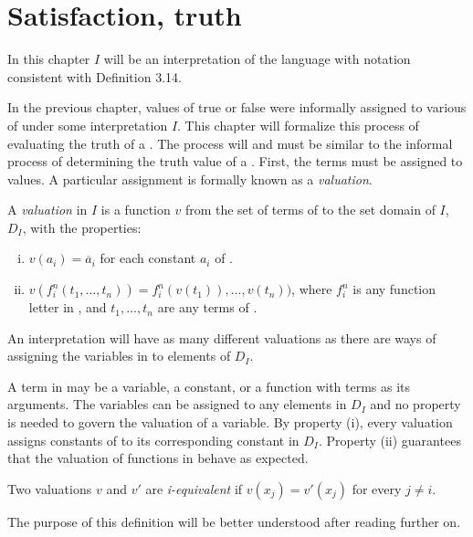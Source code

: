 \section{Satisfaction, truth}

In this chapter \(I\) will be an interpretation of the language \cl{} with notation consistent with Definition 3.14.

In the previous chapter, values of true or false were informally assigned to various \wfs{} of \cl{} under some interpretation \(I\). This chapter will formalize this process of evaluating the truth of a \wf{}. The process will and must be similar to the informal process of determining the truth value of a \wf{}. First, the terms must be assigned to values. A particular assignment is formally known as a \textit{valuation}.

\setcounter{definition}{16}
\begin{definition}
  A \textit{valuation} in \(I\) is a function \(v\) from the set of terms of \cl{} to the set domain of \(I\), \(D_I\), with the properties:
  \begin{enumerate}[(i)]
    \item \(v(a_i) = \overline{a}_i\) for each constant \(a_i\) of \cl{}.
    \item \(v(f^n_i(t_1, \dots, t_n)) = f^n_i(v(t_1)), \dots, v(t_n))\), where \(f^n_i\) is any function letter in \cl{}, and \(t_1, \dots, t_n\) are any terms of \cl{}.
  \end{enumerate}

  \note{} An interpretation will have as many different valuations as there are ways of assigning the variables in \cl{} to elements of \(D_I\).

  \note{} A term in \cl{} may be a variable, a constant, or a function with terms as its arguments. The variables can be assigned to any elements in \(D_I\) and no property is needed to govern the valuation of a variable. By property (i), every valuation assigns constants of \cl{} to its corresponding constant in \(D_I\). Property (ii) guarantees that the valuation of functions in \cl{} behave as expected.
\end{definition}

\setcounter{definition}{18}
\begin{definition}
  Two valuations \(v\) and \(v'\) are \textit{i-equivalent} if \(v(x_j) = v'(x_j)\) for every \(j \neq i\).

  \note{} The purpose of this definition will be better understood after reading further on.
\end{definition}

